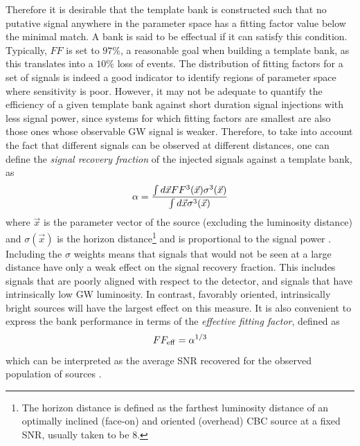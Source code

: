 \documentclass[binding=0.6cm, LaM]{sapthesis}
\begin{document}
	Therefore it is desirable that the template bank is constructed such that 
	no putative signal anywhere in the parameter space
	has a fitting factor value below the minimal match. 
	A bank is said to be effectual if it can satisfy this condition.
	Typically, $FF$ is set to $97\%$, a reasonable goal when building a template bank, 
	as this translates into a $10\%$ loss of events.
	The distribution of fitting factors for a set of signals is indeed a good indicator to identify regions of parameter space where sensitivity is poor.
	However, it may not be adequate to quantify the efficiency of a given template bank against short duration signal injections with less signal power,
	since systems for which fitting factors are smallest are also those ones whose observable GW signal is weaker. 
	Therefore, to take into account the fact that different signals can be observed at different distances, 
	one can define the \emph{signal recovery fraction} of the injected signals against a template bank, as
	\begin{equation}
          \alpha = {{\int d \vec{x} FF^3(\vec{x}) \sigma^3(\vec{x})} \over {\int d \vec{x} \sigma^3(\vec{x})}}
	\end{equation}
	where $\vec{x}$ is the parameter vector of the source (excluding the luminosity distance) 
	and $\sigma(\vec{x})$ is the horizon distance\footnote{The horizon distance is defined as the farthest luminosity distance of an optimally inclined (face-on) and oriented (overhead) CBC source at a fixed SNR, usually taken to be 8.} 
	and is proportional to the signal power \cite{125}. 
	Including the $\sigma$ weights means that signals that 
	would not be seen at a large distance have only a weak effect on the signal recovery fraction. 
	This includes signals that are poorly aligned with respect to the detector, 
	and signals that have intrinsically low GW luminosity. 
	In contrast, favorably oriented, intrinsically bright sources will have the largest effect on this measure. 
	It is also convenient to express the bank performance in terms of the \emph{effective fitting factor}, defined as 
	\begin{equation}
	FF_{\rm eff} = \alpha^{1/3}
	\end{equation}
	which can be interpreted as the average SNR recovered for the observed population of sources \cite{127}.
\end{document}
